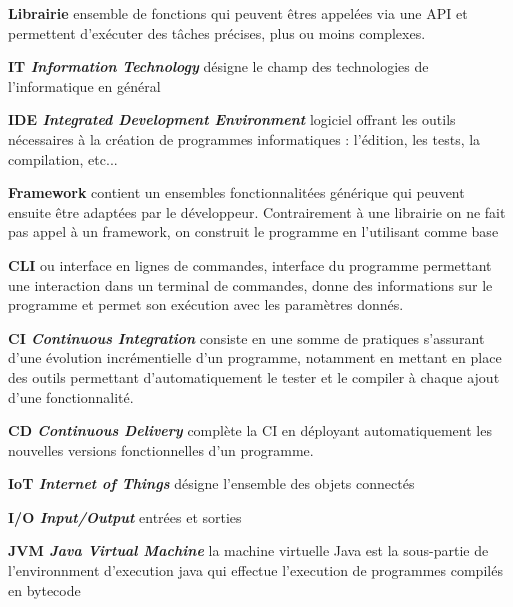 \documentclass[french,a4paper,12pt]{report}
\begin{document}
\bigskip

\hypertarget{Librairie}{\noindent\textbf{Librairie} ensemble de fonctions qui peuvent êtres appelées via une API et permettent d'exécuter des tâches précises, plus ou moins complexes.}

\bigskip

\hypertarget{IT}{\noindent\textbf{IT \emph{Information Technology}} désigne le champ des technologies de l'informatique en général}

\bigskip

\hypertarget{IDE}{\noindent\textbf{IDE \emph{Integrated Development Environment}} logiciel offrant les outils nécessaires à la création de programmes informatiques : l'édition, les tests, la compilation, etc...}

\bigskip

\hypertarget{Framework}{\noindent\textbf{Framework} contient un ensembles fonctionnalitées générique qui peuvent ensuite être adaptées par le développeur. Contrairement à une librairie on ne fait pas appel à un framework, on construit le programme en l'utilisant comme base}

\bigskip

\hypertarget{CLI}{\noindent\textbf{CLI} ou interface en lignes de commandes, interface du programme permettant une interaction dans un terminal de commandes, donne des informations sur le programme et permet son exécution avec les paramètres donnés. }

\bigskip

\hypertarget{CI}{\noindent\textbf{CI \emph{Continuous Integration}} consiste en une somme de pratiques s'assurant d'une évolution incrémentielle d'un programme, notamment en mettant en place des outils permettant d'automatiquement le tester et le compiler à chaque ajout d'une fonctionnalité.}

\bigskip

\hypertarget{CD}{\noindent\textbf{CD \emph{Continuous Delivery}} complète la CI en déployant automatiquement les nouvelles versions fonctionnelles d'un programme.} 

\bigskip

\hypertarget{IoT}{\noindent\textbf{IoT \emph{Internet of Things}} désigne l'ensemble des objets connectés} 

\bigskip

\hypertarget{IO}{\noindent\textbf{I/O \emph{Input/Output}} entrées et sorties}

\bigskip

\hypertarget{JVM}{\noindent\textbf{JVM \emph{Java Virtual Machine}} la machine virtuelle Java est la sous-partie de l'environnment d'execution java qui effectue l'execution de programmes compilés en bytecode}
\end{document}
